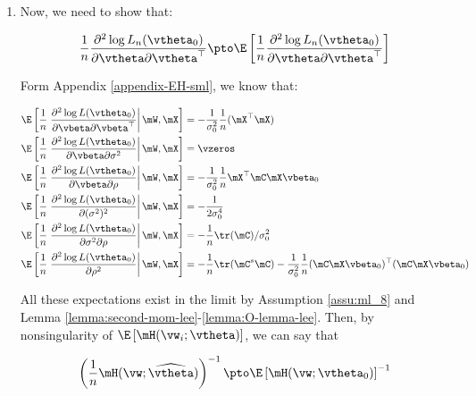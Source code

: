 \begin{subappendices}
\begin{enumerate}
   
   \item Now, we need to show that:
   
   \begin{equation}
     \frac{1}{n}\frac{\partial^2 \log L_n(\vtheta_0)}{\partial \vtheta \partial \vtheta^\top}\pto \E\left[\frac{1}{n}\frac{\partial^2 \log L_n(\vtheta_0)}{\partial \vtheta \partial \vtheta^\top}\right]
   \end{equation}
   
   Form Appendix \ref{appendix-EH-sml}, we know that:
   
   \begin{equation*}
    \begin{aligned}
     \E\left[\frac{1}{n}\left.\frac{\partial^2  \log L(\vtheta_0)}{\partial \vbeta \partial \vbeta^\top} \right|\mW, \mX\right] & = -\frac{1}{\sigma^2_0}\frac{1}{n}(\mX^\top\mX) \\
     \E\left[\frac{1}{n}\left.\frac{\partial^2  \log L(\vtheta_0)}{\partial \vbeta \partial \sigma^2} \right|\mW, \mX\right] & = \vzeros \\
      \E\left[\frac{1}{n}\left.\frac{\partial^2  \log L(\vtheta_0)}{\partial \vbeta \partial \rho} \right|\mW, \mX\right] & = - \frac{1}{\sigma^2_0} \frac{1}{n}\mX^\top\mC\mX\vbeta_0 \\
      \E\left[\frac{1}{n}\left.\frac{\partial^2 \log L(\vtheta_0)}{\partial (\sigma^2)^2}\right|\mW, \mX\right] & = - \frac{1}{2\sigma^4_0}  \\
      \E\left[\frac{1}{n}\left.\frac{\partial^2 \log L(\vtheta_0)}{\partial \sigma^2 \partial \rho}\right|\mW,\mX\right] & = - \frac{1}{n}\tr(\mC)/\sigma^2_0 \\
      \E\left[\frac{1}{n}\left.\frac{\partial^2 \log L(\vtheta_0)}{\partial \rho ^2}\right|\mW, \mX\right] & = - \frac{1}{n}\tr(\mC^s\mC) - \frac{1}{\sigma^2_0}\frac{1}{n}(\mC\mX\vbeta_0)^\top(\mC\mX\vbeta_0)
    \end{aligned}
   \end{equation*}
   
   All these expectations exist in the limit by Assumption \ref{assu:ml_8} and Lemma \ref{lemma:second-mom-lee}-\ref{lemma:O-lemma-lee}. Then, by nonsingularity of $\E\left[\mH(\vw_i;\vtheta)\right]$, we can say that 
   
   \begin{equation*}
   \left(\frac{1}{n}\mH(\vw;\widehat{\vtheta})\right)^{-1}\pto \E\left[\mH(\vw;\vtheta_0)\right]^{-1}
   \end{equation*}
   


\end{enumerate}
\end{subappendices}
